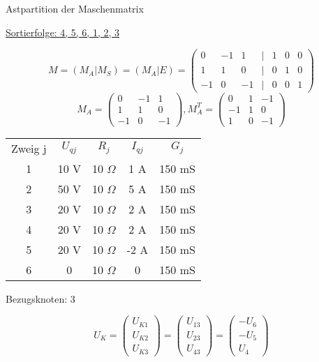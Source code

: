 \documentclass[german]{article}
\newcommand{\ohm}{\Omega}
\begin{document}
Astpartition der Maschenmatrix

\underline{Sortierfolge: 4, 5, 6, 1, 2, 3}

\[
	M = (M_A | M_S) = (M_A | E) =
	\begin{pmatrix}
		0 & -1 & 1 & | & 1 & 0 & 0 \\
		1 & 1 & 0 & | & 0 & 1 & 0 \\
		-1 & 0 & -1 & | & 0 & 0 & 1
	\end{pmatrix}
\]
\[
	M_A = \begin{pmatrix}
		0 & -1 & 1 \\
		1 & 1 & 0 \\
		-1 & 0 & -1
	\end{pmatrix},
	M_A^T = \begin{pmatrix}
		0 & 1 & -1 \\
		-1 & 1 & 0 \\
		1 & 0 & -1
	\end{pmatrix}
\]


\begin{tabular}{c|c|c|c|c}
	Zweig j & $U_{qj}$ & $R_j$ & $I_{qj}$ & $G_j$ \\
	1 & 10 V & 10 $\ohm$ & 1 A & 150 mS \\
	2 & 50 V & 10 $\ohm$ & 5 A & 150 mS \\
	3 & 20 V & 10 $\ohm$ & 2 A & 150 mS \\
	4 & 20 V & 10 $\ohm$ & 2 A & 150 mS \\
	5 & 20 V & 10 $\ohm$ & {\color{yellow} -2 A} & 150 mS \\
	6 & 0 & 10 $\ohm$ & 0 & 150 mS \\
\end{tabular}

Bezugsknoten: 3

\[
	U_K = \begin{pmatrix}
		U_{K1} \\
		U_{K2} \\
		U_{K3}
	\end{pmatrix} = \begin{pmatrix}
		U_{13} \\
		U_{23} \\
		U_{43}
	\end{pmatrix} = \begin{pmatrix}
		- U_6 \\
		- U_5 \\
		U_4
	\end{pmatrix}
\]
\end{document}
